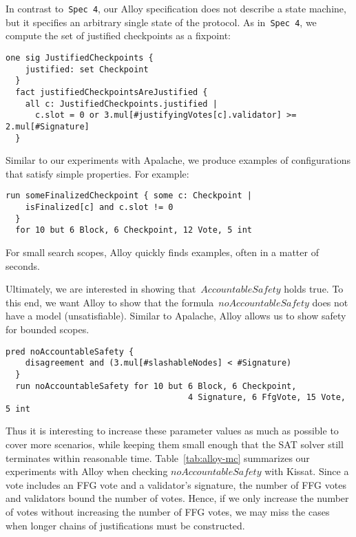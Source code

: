 In contrast to~\texttt{Spec 4}, our Alloy specification does not describe a
state machine, but it specifies an arbitrary single state of the protocol. As
in~\texttt{Spec 4}, we compute the set of justified checkpoints as a fixpoint:

\begin{lstlisting}[language=alloy,columns=fullflexible]
  one sig JustifiedCheckpoints {
    justified: set Checkpoint
  }
  fact justifiedCheckpointsAreJustified {
    all c: JustifiedCheckpoints.justified |
      c.slot = 0 or 3.mul[#justifyingVotes[c].validator] >= 2.mul[#Signature]
  }
\end{lstlisting}

Similar to our experiments with Apalache, we produce examples of configurations
that satisfy simple properties. For example:

\begin{lstlisting}[language=alloy,columns=fullflexible]
  run someFinalizedCheckpoint { some c: Checkpoint |
    isFinalized[c] and c.slot != 0
  }
  for 10 but 6 Block, 6 Checkpoint, 12 Vote, 5 int
\end{lstlisting}

For small search scopes, Alloy quickly finds examples, often in a matter
of seconds.

Ultimately, we are interested in showing that~$\textit{AccountableSafety}$
holds true. To this end, we want Alloy to show that the
formula~$\textit{noAccountableSafety}$ does not have a model (unsatisfiable).
Similar to Apalache, Alloy allows us to show safety for bounded scopes.

\begin{lstlisting}[language=alloy,columns=fullflexible]
  pred noAccountableSafety {
    disagreement and (3.mul[#slashableNodes] < #Signature)
  }
  run noAccountableSafety for 10 but 6 Block, 6 Checkpoint,
                                     4 Signature, 6 FfgVote, 15 Vote, 5 int
\end{lstlisting}

Thus it is interesting to increase these parameter values as much as possible
to cover more scenarios, while keeping them small enough that the SAT solver
still terminates within reasonable time. Table~\ref{tab:alloy-mc} summarizes
our experiments with Alloy when checking $\textit{noAccountableSafety}$ with
Kissat.  Since a vote includes an FFG vote and a validator's signature, the
number of FFG votes and validators bound the number of votes. Hence, if we only
increase the number of votes without increasing the number of FFG votes, we may
miss the cases when longer chains of justifications must be constructed.

